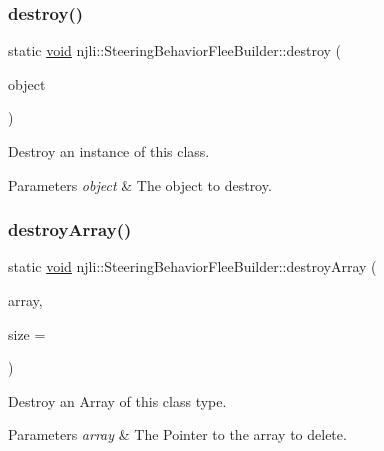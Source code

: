 \subsubsection{\texorpdfstring{destroy()}{destroy()}}
{\footnotesize\ttfamily static \mbox{\hyperlink{_thread_8h_af1e856da2e658414cb2456cb6f7ebc66}{void}} njli\+::\+Steering\+Behavior\+Flee\+Builder\+::destroy (\begin{DoxyParamCaption}\item[{\mbox{\hyperlink{classnjli_1_1_steering_behavior_flee_builder}{Steering\+Behavior\+Flee\+Builder}} $\ast$}]{object }\end{DoxyParamCaption})\hspace{0.3cm}{\ttfamily [static]}}

Destroy an instance of this class.


\begin{DoxyParams}{Parameters}
{\em object} & The object to destroy. \\
\hline
\end{DoxyParams}
\mbox{\label{classnjli_1_1_steering_behavior_flee_builder_a25155ee100e076c66794a4051bbd16f8}} 
\subsubsection{\texorpdfstring{destroy\+Array()}{destroyArray()}}
{\footnotesize\ttfamily static \mbox{\hyperlink{_thread_8h_af1e856da2e658414cb2456cb6f7ebc66}{void}} njli\+::\+Steering\+Behavior\+Flee\+Builder\+::destroy\+Array (\begin{DoxyParamCaption}\item[{\mbox{\hyperlink{classnjli_1_1_steering_behavior_flee_builder}{Steering\+Behavior\+Flee\+Builder}} $\ast$$\ast$}]{array,  }\item[{const \mbox{\hyperlink{_util_8h_a10e94b422ef0c20dcdec20d31a1f5049}{u32}}}]{size = {} }\end{DoxyParamCaption})\hspace{0.3cm}{\ttfamily [static]}}

Destroy an Array of this class type.


\begin{DoxyParams}{Parameters}
{\em array} & The Pointer to the array to delete. \\
\hline
\end{DoxyParams}
\mbox{\label{classnjli_1_1_steering_behavior_flee_builder_a4fa3eadb353fc868847d9237b128aea8}} 
